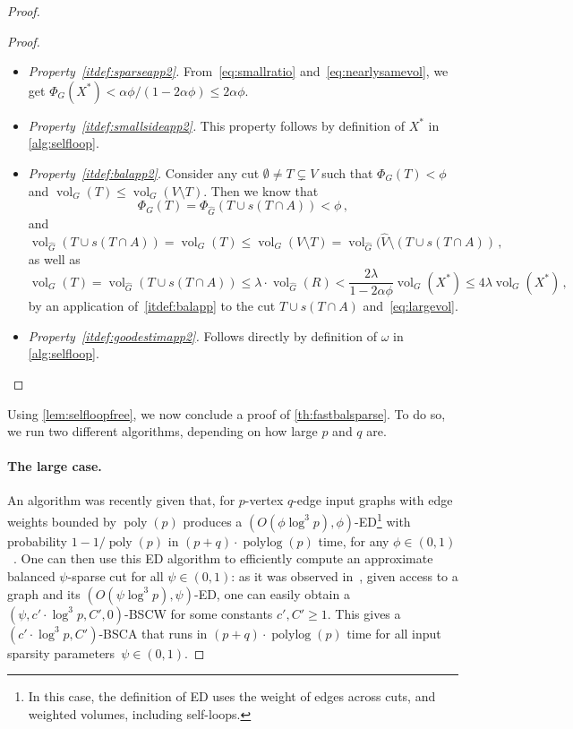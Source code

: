 \documentclass[epsfig,letter,11pt]{article}
\numberwithin{equation}{section}
\DeclareMathOperator{\vol}{vol}
\renewcommand{\hat}{\widehat}
\DeclareMathOperator*{\poly}{poly}
\DeclareMathOperator*{\pylog}{polylog}
\begin{document}
\begin{proof}
\begin{proof}
\begin{itemize}
	\item \textit{Property~\eqref{itdef:sparseapp2}.} From~\eqref{eq:smallratio} and~\eqref{eq:nearlysamevol}, we get $\Phi_G(X^*) < 	\alpha\phi /({1-2\alpha \phi}) \le 2 \alpha \phi$.
	\item \textit{Property~\eqref{itdef:smallsideapp2}.} This property follows by definition of $X^*$ in \cref{alg:selfloop}.
	\item \textit{Property~\eqref{itdef:balapp2}.} Consider any cut $\emptyset \neq T \subsetneq V$ such that $\Phi_G(T) < \phi$ and $\vol_G(T) \le \vol_G(V \setminus T)$. Then we know that
	\begin{equation*}
		\Phi_G(T) = \Phi_{\hat{G}}(T \cup s(T \cap A)) < \phi \, ,
	\end{equation*}
	and
	\begin{equation*}
		\vol_{\hat{G}}(T \cup s(T \cap A)) = \vol_G(T) \le \vol_G(V \setminus T) = \vol_{\hat{G}}(\hat{V} \setminus (T \cup s(T \cap A))\, ,
	\end{equation*}
	as well as
	\begin{equation*}
		\vol_G(T) = \vol_{\hat{G}}(T \cup s(T \cap A)) \le \lambda \cdot \vol_{\hat{G}}(R) < \frac{2\lambda}{1-2\alpha \phi}\vol_G(X^*) \le 4\lambda \vol_G(X^*)\, ,
	\end{equation*}
	by an application of~\eqref{itdef:balapp} to the cut $T \cup s(T \cap A)$ and~\eqref{eq:largevol}.
	\item \textit{Property~\eqref{itdef:goodestimapp2}.} Follows directly by definition of $\omega$ in \cref{alg:selfloop}.
\end{itemize}
\end{proof}
\noindent
Using \cref{lem:selfloopfree}, we now conclude a proof of \cref{th:fastbalsparse}. To do so, we run two different algorithms, depending on how large $p$ and $q$ are.

\paragraph{The large case.}
An algorithm was recently given that, for $p$-vertex $q$-edge input graphs with edge weights bounded by $\poly(p)$ produces a $(O(\phi \log^3 p), \phi)$-ED\footnote{In this case, the definition of ED uses the weight of edges across cuts, and weighted volumes, including self-loops.} with probability $1-1/\poly(p)$ in $(p+q)\cdot \pylog(p)$ time, for any $\phi \in (0,1)$~\cite{liexpdec}. One can then use this ED algorithm to efficiently compute an approximate balanced $\psi$-sparse cut for all $\psi \in (0,1)$: as it was observed in~\cite{offlineexpdec}, given access to a graph and its $(O(\psi \log^3p), \psi)$-ED, one can easily obtain a $(\psi,c' \cdot \log^3 p, C',0)$-BSCW for some constants $c',C'\ge 1$. This gives a $(c' \cdot \log^3 p, C')$-BSCA that runs in $(p+q)\cdot \pylog(p)$ time for all input sparsity parameters~$\psi \in (0,1)$.


\end{proof}
\end{document}
